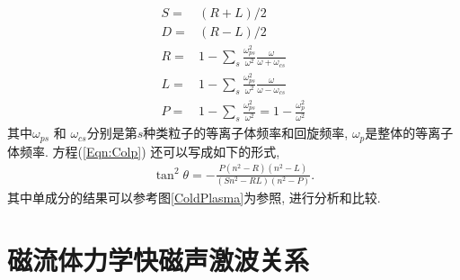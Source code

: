 \documentclass{article}
\begin{document}
	\begin{align*}
		S =& (R + L) / 2
		\\
		D =& (R - L) / 2
		\\
		R =& 1 - \sum_s \frac{\omega_{ps}^2}{\omega^2} \frac{\omega}{\omega + \omega_{cs}}
		\\
		L =& 1 - \sum_s \frac{\omega_{ps}^2}{\omega^2} \frac{\omega}{\omega - \omega_{cs}}
		\\
		P =& 1 - \sum_s \frac{\omega_{ps}^2}{\omega^2}  = 1 - \frac{\omega_p^2}{\omega^2}
	\end{align*}
	其中$\omega_{ps}$ 和 $\omega_{cs}$分别是第$s$种类粒子的等离子体频率和回旋频率, $\omega_p$是整体的等离子体频率. 方程(\ref{Eqn:Colp}) 还可以写成如下的形式,
	\begin{align*}
		\tan^2 \theta = - \frac{P (n^2 - R) (n^2 - L)}{(S n^2 - R L) (n^2 - P)}.
	\end{align*}
	其中单成分的结果可以参考图\ref{ColdPlasma}为参照, 进行分析和比较.
	
	\section{磁流体力学快磁声激波关系}
	
\end{document}
